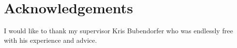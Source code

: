 \chapter*{Acknowledgements}

I would like to thank my supervisor Kris Bubendorfer who was endlessly free with his experience and advice.  